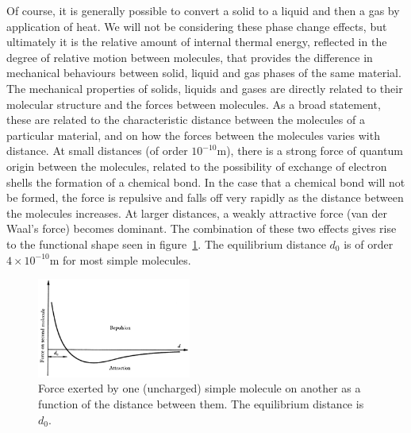 \documentclass[a4paper,11pt]		{report}
\begin{document}
Of course, it is generally possible to convert a solid to a liquid and
then a gas by application of heat. We will not be considering these
phase change effects, but ultimately it is the relative amount of
internal thermal energy, reflected in the degree of relative motion
between molecules, that provides the difference in mechanical
behaviours between solid, liquid and gas phases of the same
material. The mechanical properties of solids, liquids and gases are
directly related to their molecular structure and the forces between
molecules. As a broad statement, these are related to the
characteristic distance between the molecules of a particular
material, and on how the forces between the molecules varies with
distance. At small distances (of order $10^{-10}$m), there is a strong
force of quantum origin between the molecules, related to the
possibility of exchange of electron shells \ie the formation of a
chemical bond. In the case that a chemical bond will not be formed,
the force is repulsive and falls off very rapidly as the distance
between the molecules increases. At larger distances, a weakly
attractive force (van der Waal's force) becomes dominant. The
combination of these two effects gives rise to the functional shape
seen in figure~\ref{fig.lj}. The equilibrium distance $d_0$ is of
order $4\times10^{-10}$m for most simple molecules.

\begin{figure}
\begin{center}
\includegraphics[width=0.45\textwidth]{Bat-1.1.1.eps}
\end{center}
\caption{Force exerted by one (uncharged) simple molecule on another
  as a function of the distance between them. The equilibrium distance
  is $d_0$. \citep[From][]{bat67}}
\label{fig.lj}
\end{figure}
\end{document}
